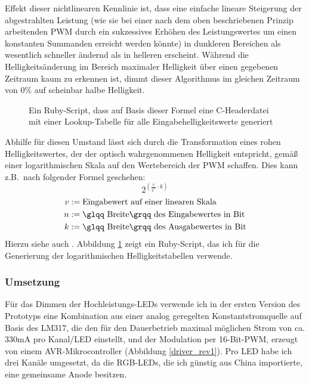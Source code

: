 \documentclass[12pt,a4paper,notitlepage]{article}
\begin{document}
Effekt dieser nichtlinearen Kennlinie ist, dass eine einfache lineare Steigerung der abgestrahlten Leistung (wie sie bei einer nach dem oben beschriebenen Prinzip arbeitenden \gls{PWM} durch ein sukzessives Erhöhen des Leistungswertes um einen konstanten Summanden erreicht werden könnte) in dunkleren Bereichen als wesentlich schneller ändernd als in helleren erscheint. Während die Helligkeitsänderung im Bereich maximaler Helligkeit über einen gegebenen Zeitraum kaum zu erkennen ist, dimmt dieser Algorithmus im gleichen Zeitraum von $0\%$ auf scheinbar halbe Helligkeit.

\begin{figure}

\caption{Ein Ruby-Script, dass auf Basis dieser Formel eine C-Headerdatei mit einer Lookup-Tabelle für alle Eingabehelligkeitswerte generiert}
\label{log_lut_gen}
\end{figure}

Abhilfe für diesen Umstand lässt sich durch die Transformation eines rohen Helligkeitswertes, der der optisch wahrgenommenen Helligkeit entspricht, gemäß einer logarithmischen Skala auf den Wertebereich der \gls{PWM} schaffen. Dies kann z.B.\ nach folgender Formel geschehen:
\begin{equation}
2^{\left(\frac{\scriptstyle v}{\scriptstyle 2^n}\cdot k\right)}
\end{equation}
\begin{align}
v&:=\text{Eingabewert auf einer linearen Skala}\\
n&:=\text{\glqq Breite\grqq\ des Eingabewertes in Bit}\\
k&:=\text{\glqq Breite\grqq\  des Ausgabewertes in Bit}
\end{align}
Hierzu siehe auch \cite{MAXIM41,MAXIM57,SIART1}. Abbildung \ref{log_lut_gen} %
zeigt ein Ruby-Script, das ich für die Generierung der logarithmischen Helligkeitstabellen verwende.

\subsubsection{Umsetzung}
Für das Dimmen der Hochleistungs-LEDs verwende ich in der ersten Version des Prototyps eine Kombination aus einer analog geregelten Konstantstromquelle auf Basis des LM317\cite{NATIONAL3}, die den für den Dauerbetrieb maximal möglichen Strom von ca. 330mA pro Kanal/LED einstellt, und der Modulation per 16-Bit-PWM, erzeugt von einem AVR-Mikrocontroller (Abbildung \ref{driver_rev1}).
Pro LED habe ich drei Kanäle umgesetzt, da die RGB-LEDs, die ich günstig aus China importierte, %
eine gemeinsame Anode besitzen.
\end{document}

